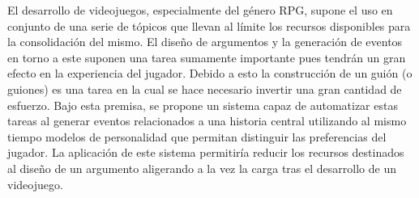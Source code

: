 \begin{resumen}

El desarrollo de videojuegos, especialmente del género RPG, supone el uso en conjunto de una serie de tópicos que llevan al límite los recursos disponibles para la consolidación del mismo. El diseño de argumentos y la generación de eventos en torno a este suponen una tarea sumamente importante pues tendrán un gran efecto en la experiencia del jugador. Debido a esto la construcción de un guión (o guiones) es una tarea en la cual se hace necesario invertir una gran cantidad de esfuerzo. Bajo esta premisa, se propone un sistema capaz de automatizar estas tareas al generar eventos relacionados a una historia central utilizando al mismo tiempo modelos de personalidad que permitan distinguir las preferencias del jugador. La aplicación de este sistema permitiría reducir los recursos destinados al diseño de un argumento aligerando a la vez la carga tras el desarrollo de un videojuego.


\end{resumen}
